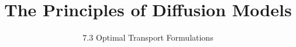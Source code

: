 
\title{The Principles of Diffusion Models}
\subtitle{7.3 Optimal Transport Formulations}


\begin{frame}
    \titlepage
\end{frame}


